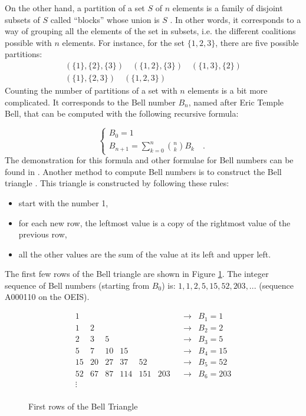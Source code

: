 On the other hand, a partition of a set $S$ of $n$ elements is a family of disjoint subsets of $S$ called ``blocks'' whose union is $S$ \cite{Rota1964}.
In other words, it corresponds to a way of grouping all the elements of the set in subsets, i.e. the different coalitions possible with $n$ elements. For instance, for the set $\{1,2,3\}$, there are five possible partitions:
\begin{gather*}
(\{1\},\{2\},\{3\}) \quad (\{1,2\},\{3\}) \quad (\{1,3\},\{2\}) \\
(\{1\},\{2,3\}) \quad  (\{1,2,3\})
\end{gather*}
Counting the number of partitions of a set with $n$ elements is a bit more complicated. It corresponds to the Bell number $B_n$, named after Eric Temple Bell, that can be computed with the following recursive formula:

\begin{equation}
    \begin{cases}
         B_0 = 1\\
         B_{n+1} = \sum\limits_{k=0}^n \binom nk B_k \quad \text{.}
     \end{cases}
\end{equation}
The demonstration for this formula and other formulae for Bell numbers can be found in \cite{Graham1988, Rota1964}.
Another method to compute Bell numbers is to construct the Bell triangle \cite{Aitken1933}. This triangle is constructed by following these rules:
\begin{itemize}
\item start with the number 1,
\item for each new row, the leftmost value is a copy of the rightmost value of the previous row,
\item all the other values are the sum of the value at its left and upper left.
\end{itemize}
 The first few rows of the Bell triangle are shown in Figure \ref{bell}. The integer sequence of Bell numbers (starting from $B_0$) is: $1, 1, 2, 5, 15, 52, 203, ...$ (sequence A000110 on the OEIS).\\

\begin{figure}[h]
\begin{center}
 \[ 
    \begin{matrix}
    1 & & & & & & & \longrightarrow & B_1= 1\\
    1 & 2 & & & & & & \longrightarrow & B_2= 2\\
    2 & 3 & 5 & & & & & \longrightarrow & B_3= 5\\
    5 & 7 & 10 & 15 & & &&  \longrightarrow & B_4= 15\\
    15 & 20 & 27 & 37 & 52 & & & \longrightarrow & B_5= 52\\
    52 & 67 & 87 & 114 & 151 & 203 & & \longrightarrow & B_6= 203\\    
    \vdots\\
    \end{matrix}
\]
\caption{\label{bell} First rows of the Bell Triangle}
\end{center}
\end{figure}

